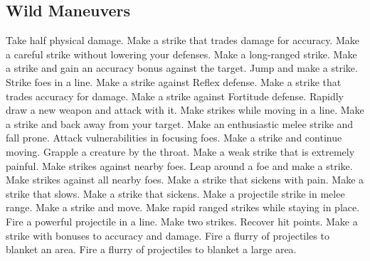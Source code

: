 \subsection{Wild Maneuvers}\label{Wild Maneuvers}
\begin{spelllist}
 Take half physical damage.
 Make a strike that trades damage for accuracy.
 Make a careful strike without lowering your defenses.
 Make a long-ranged strike.
 Make a strike and gain an accuracy bonus against the target.
 Jump and make a strike.
 Strike foes in a line.
 Make a strike against Reflex defense.
 Make a strike that trades accuracy for damage.
 Make a strike against Fortitude defense.
 Rapidly draw a new weapon and attack with it.
 Make strikes while moving in a line.
 Make a strike and back away from your target.
 Make an enthusiastic melee strike and fall prone.
 Attack vulnerabilities in focusing foes.
 Make a strike and continue moving.
 Grapple a creature by the throat.
 Make a weak strike that is extremely painful.
 Make strikes against nearby foes.
 Leap around a foe and make a strike.
 Make strikes against all nearby foes.
 Make a strike that sickens with pain.
 Make a strike that slows.
 Make a strike that sickens.
 Make a projectile strike in melee range.
 Make a strike and move.
 Make rapid ranged strikes while staying in place.
 Fire a powerful projectile in a line.
 Make two strikes.
 Recover hit points.
 Make a strike with bonuses to accuracy and damage.
 Fire a flurry of projectiles to blanket an area.
 Fire a flurry of projectiles to blanket a large area.
\end{spelllist}
